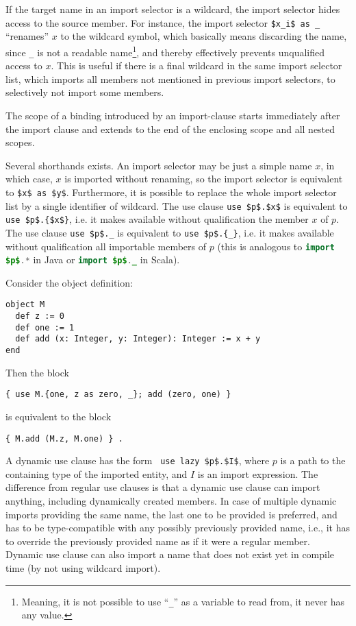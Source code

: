 If the target name in an import selector is a wildcard, the import selector hides access to the source member. For instance, the import selector \lstinline!$x_i$ as _! ``renames'' $x$ to the wildcard symbol, which basically means discarding the name, since \lstinline!_! is not a readable name\footnote{Meaning, it is not possible to use ``\lstinline!_!'' as a variable to read from, it never has any value.}, and thereby effectively prevents unqualified access to $x$. This is useful if there is a final wildcard in the same import selector list, which imports all members not mentioned in previous import selectors, to selectively not import some members. 

The scope of a binding introduced by an import-clause starts immediately after the import clause and extends to the end of the enclosing scope and all nested scopes. 

Several shorthands exists. An import selector may be just a simple name $x$, in which case, $x$ is imported without renaming, so the import selector is equivalent to \lstinline!$x$ as $y$!. Furthermore, it is possible to replace the whole import selector list by a single identifier of wildcard. The use clause \lstinline!use $p$.$x$! is equivalent to \lstinline!use $p$.{$x$}!, i.e. it makes available without qualification the member $x$ of $p$. The use clause \lstinline!use $p$._! is equivalent to \lstinline!use $p$.{_}!, i.e. it makes available without qualification all importable members of $p$ (this is analogous to \lstinline[language=Java]!import $p$.*! in Java or \lstinline[language=Java]!import $p$._! in Scala). 

\example Consider the object definition:
\begin{lstlisting}
object M
  def z := 0
  def one := 1
  def add (x: Integer, y: Integer): Integer := x + y
end
\end{lstlisting}
Then the block
\begin{lstlisting}
{ use M.{one, z as zero, _}; add (zero, one) }
\end{lstlisting}
is equivalent to the block
\begin{lstlisting}
{ M.add (M.z, M.one) } .
\end{lstlisting}

A dynamic use clause has the form ~\lstinline!use lazy $p$.$I$!, where $p$ is a path to the containing type of the imported entity, and $I$ is an import expression. The difference from regular use clauses is that a dynamic use clause can import anything, including dynamically created members. In case of multiple dynamic imports providing the same name, the last one to be provided is preferred, and has to be type-compatible with any possibly previously provided name, i.e., it has to override the previously provided name as if it were a regular member. Dynamic use clause can also import a name that does not exist yet in compile time (by not using wildcard import). 

